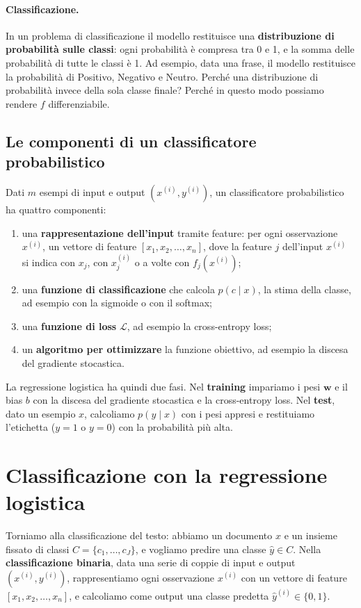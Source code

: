 \paragraph{Classificazione.} In un problema di classificazione il modello restituisce una \textbf{distribuzione di probabilità sulle classi}: ogni probabilità è compresa tra 0 e 1, e la somma delle probabilità di tutte le classi è 1. Ad esempio, data una frase, il modello restituisce la probabilità di Positivo, Negativo e Neutro. Perché una distribuzione di probabilità invece della sola classe finale? Perché in questo modo possiamo rendere $f$ differenziabile.

\subsection{Le componenti di un classificatore probabilistico}
Dati $m$ esempi di input e output $(x^{(i)}, y^{(i)})$, un classificatore probabilistico ha quattro componenti:
\begin{enumerate}
    \item una \textbf{rappresentazione dell'input} tramite feature: per ogni osservazione $x^{(i)}$, un vettore di feature $[x_1, x_2, \dots, x_n]$, dove la feature $j$ dell'input $x^{(i)}$ si indica con $x_j$, con $x_j^{(i)}$ o a volte con $f_j(x^{(i)})$;
    \item una \textbf{funzione di classificazione} che calcola $p(c \mid x)$, la stima della classe, ad esempio con la sigmoide o con il softmax;
    \item una \textbf{funzione di loss} $\mathcal{L}$, ad esempio la cross-entropy loss;
    \item un \textbf{algoritmo per ottimizzare} la funzione obiettivo, ad esempio la discesa del gradiente stocastica.
\end{enumerate}
La regressione logistica ha quindi due fasi. Nel \textbf{training} impariamo i pesi $\mathbf{w}$ e il bias $b$ con la discesa del gradiente stocastica e la cross-entropy loss. Nel \textbf{test}, dato un esempio $x$, calcoliamo $p(y \mid x)$ con i pesi appresi e restituiamo l'etichetta ($y = 1$ o $y = 0$) con la probabilità più alta.

\section{Classificazione con la regressione logistica}
Torniamo alla classificazione del testo: abbiamo un documento $x$ e un insieme fissato di classi $C = \{c_1, \dots, c_J\}$, e vogliamo predire una classe $\hat{y} \in C$. Nella \textbf{classificazione binaria}, data una serie di coppie di input e output $(x^{(i)}, y^{(i)})$, rappresentiamo ogni osservazione $x^{(i)}$ con un vettore di feature $[x_1, x_2, \dots, x_n]$, e calcoliamo come output una classe predetta $\hat{y}^{(i)} \in \{0, 1\}$.

